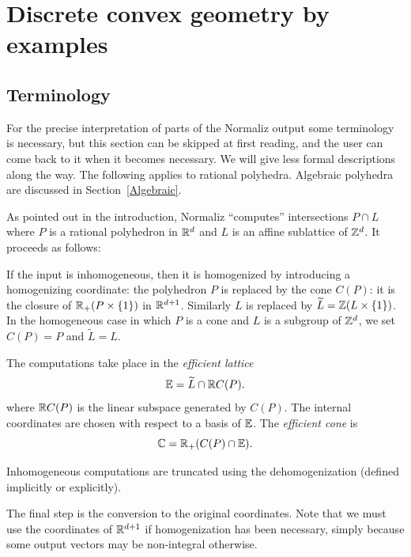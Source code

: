 
\section{Discrete convex geometry by examples}\label{Examples}

\subsection{Terminology}\label{Term}

For the precise interpretation of parts of the Normaliz output some terminology is necessary, but this section can be skipped at first reading, and the user can come back to it when it becomes necessary. We will give less formal descriptions along the way. The following applies to rational polyhedra. Algebraic polyhedra are discussed in Section~\ref{Algebraic}.

As pointed out in the introduction, Normaliz ``computes'' intersections $P\cap L$ where $P$ is a rational polyhedron in ${\mathbb R}^d$ and $L$ is an affine sublattice of ${\mathbb Z}^d$. It proceeds as follows:

\begin{arab}
	\item If the input is inhomogeneous, then it is homogenized by introducing a homogenizing coordinate: the polyhedron $P$ is replaced by the cone $C(P)$: it is the closure of ${\mathbb R}_+(P\times \{1\})$ in ${\mathbb R}^{d+1}$. Similarly $L$ is replaced by $\widetilde L={\mathbb Z}(L\times \{1\})$. In the homogeneous case in which $P$ is a cone and $L$ is a subgroup of ${\mathbb Z}^d$, we set $C(P)=P$ and $\widetilde L=L$.
	
	\item The computations take place in the \emph{efficient lattice}
	$$
	{\mathbb E}=\widetilde{L}\cap {\mathbb R} C(P).
	$$
	where ${\mathbb R} C(P)$ is the linear subspace generated by $C(P)$. The internal coordinates are chosen with respect to a basis of ${\mathbb E}$. The \emph{efficient cone} is
	$$
	{\mathbb C}={\mathbb R}_+(C(P)\cap {\mathbb E}).
	$$
	
	\item Inhomogeneous computations are truncated using the dehomogenization (defined implicitly or explicitly).
	
	\item The final step is the conversion to the original coordinates. Note that we must use the coordinates of ${\mathbb R}^{d+1}$ if homogenization has been necessary, simply because some output vectors may be non-integral otherwise.
\end{arab}


